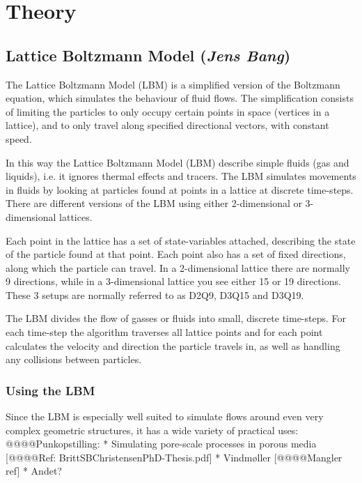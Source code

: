 \section{Theory}

\subsection{Lattice Boltzmann Model (\textit{Jens Bang})}
The Lattice Boltzmann Model (LBM) is a simplified version of the Boltzmann equation, which simulates the behaviour of fluid flows. The simplification consists of limiting the particles to only occupy certain points in space (vertices in a lattice), and to only travel along specified directional vectors, with constant speed. 

In this way the Lattice Boltzmann Model (LBM) describe simple fluids (gas and liquids), i.e. it ignores thermal effects and tracers. The LBM simulates movements in fluids by looking at particles found at points in a lattice at discrete time-steps. There are different versions of the LBM using either 2-dimensional or 3-dimensional lattices.

Each point in the lattice has a set of state-variables attached, describing the state of the particle found at that point. Each point also has a set of fixed directions, along which the particle can travel. In a 2-dimensional lattice there are normally 9 directions, while in a 3-dimensional lattice you see either 15 or 19 directions. These 3 setups are normally referred to as D2Q9, D3Q15 and D3Q19.


The LBM divides the flow of gasses or fluids into small, discrete time-steps. For each time-step the algorithm traverses all lattice points and for each point calculates the velocity and direction the particle travels in, as well as handling any collisions between particles.

\subsubsection{Using the LBM}
Since the LBM is especially well suited to simulate flows around even very complex geometric structures, it has a wide variety of practical uses:
@@@@Punkopstilling:
* Simulating pore-scale processes in porous media [@@@@Ref: BrittSBChristensenPhD-Thesis.pdf]
* Vindmøller [@@@@Mangler ref]
* Andet?

